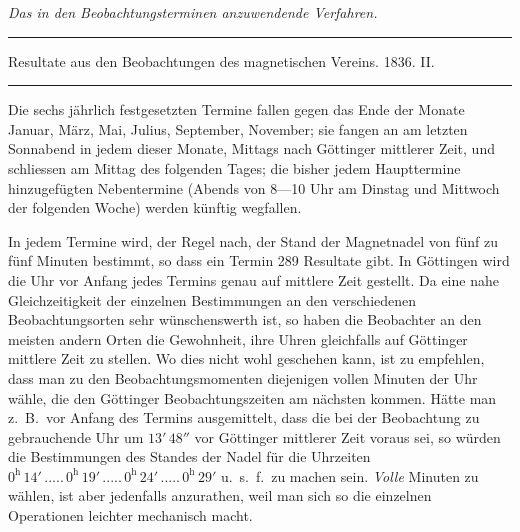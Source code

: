 \clearpage
{}
\begin{center}
{\large\itshape Das in den Beobachtungsterminen anzuwendende Verfahren.\par}
\vspace{5mm}\hrule\vspace{2mm}
{\small Resultate aus den Beobachtungen des magnetischen Vereins. 1836. II.\par}
\vspace{2mm}\hrule\vspace{5mm}
\end{center}
Die sechs jährlich festgesetzten Termine fallen gegen das Ende der Monate Januar, März, Mai, Julius, September, November; sie fangen an am letzten Sonnabend in jedem dieser Monate, Mittags nach Göttinger mittlerer Zeit, und schliessen am Mittag des folgenden Tages; die bisher jedem Haupttermine hinzugefügten Nebentermine (Abends von 8—10 Uhr am Dinstag und Mittwoch der folgenden Woche) werden künftig wegfallen.

In jedem Termine wird, der Regel nach, der Stand der Magnetnadel von fünf zu fünf Minuten bestimmt, so dass ein Termin 289 Resultate gibt. In Göttingen wird die Uhr vor Anfang jedes Termins genau auf mittlere Zeit gestellt. Da eine nahe Gleichzeitigkeit der einzelnen Bestimmungen an den verschiedenen Beobachtungsorten sehr wünschenswerth ist, so haben die Beobachter an den meisten andern Orten die Gewohnheit, ihre Uhren gleichfalls auf Göttinger mittlere Zeit zu stellen. Wo dies nicht wohl geschehen kann, ist zu empfehlen, dass man zu den Beobachtungsmomenten diejenigen vollen Minuten der Uhr wähle, die den Göttinger Beobachtungszeiten am nächsten kommen. Hätte man z.\ B.\ vor
Anfang des Termins ausgemittelt, dass die bei der Beobachtung zu gebrauchende Uhr um $13'\,48''$ vor Göttinger mittlerer Zeit voraus sei, so würden die Bestimmungen des Standes der Nadel für die Uhrzeiten $0^{\mathrm h}\,14'\,.....\,0^{\mathrm h}\,19'\,.....\,0^{\mathrm h}\,24'\,.....\,0^{\mathrm h}\,29'$ u.\ s.\ f.\ zu machen sein. \textit{Volle} Minuten zu wählen, ist aber jedenfalls anzurathen, weil man sich so die einzelnen Operationen leichter mechanisch macht.

